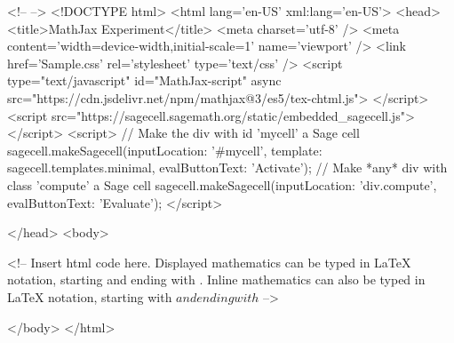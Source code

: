 <!--
-->
<!DOCTYPE html> 
<html lang='en-US' xml:lang='en-US'> 
<head><title>MathJax Experiment</title> 
<meta charset='utf-8' /> 
<meta content='width=device-width,initial-scale=1' name='viewport' /> 
<link href='Sample.css' rel='stylesheet' type='text/css' /> 
<script type="text/javascript" id="MathJax-script" async
  src="https://cdn.jsdelivr.net/npm/mathjax@3/es5/tex-chtml.js">
</script> 
 <script src="https://sagecell.sagemath.org/static/embedded_sagecell.js"></script>
<script>
    // Make the div with id 'mycell' a Sage cell
    sagecell.makeSagecell({inputLocation:  '#mycell',
                           template:       sagecell.templates.minimal,
                           evalButtonText: 'Activate'});
    // Make *any* div with class 'compute' a Sage cell
    sagecell.makeSagecell({inputLocation: 'div.compute',
                           evalButtonText: 'Evaluate'});
    </script>

</head>
<body>

<!-- 
	Insert html code here. Displayed mathematics can be typed 
	in LaTeX notation, starting and ending with $$. Inline mathematics
	can also be typed in LaTeX notation, starting with \( and ending
	with \)
-->
   


</body> 
</html>